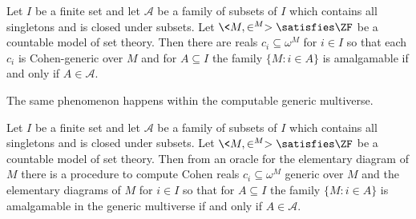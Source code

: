 \documentclass{amsart}
\begin{document}
\begin{theorem}
Let $I$ be a finite set and let $\mathcal A$ be a family of subsets of $I$ which contains all singletons and is closed under subsets. Let $\<M,\in^M>\satisfies\ZF$ be a countable
model of set theory. Then there are reals $c_i \subseteq \omega^M$ for $i \in I$ so that each $c_i$ is Cohen-generic over $M$ and for $A \subseteq I$ the family $\{M : i \in A\}$ is amalgamable if and only if $A \in \mathcal A$.
\end{theorem}
The same phenomenon happens within the computable generic multiverse.
\begin{theorem}
Let $I$ be a finite set and let $\mathcal A$ be a family of subsets of $I$ which contains all singletons and is closed under subsets. Let $\<M,\in^M>\satisfies\ZF$ be a countable model of set theory. Then from an oracle for the elementary diagram of $M$ there is a procedure to compute Cohen reals $c_i \subseteq \omega^M$ generic over $M$ and the elementary diagrams of $M$ for $i \in I$ so that for $A \subseteq I$ the family $\{M : i \in A\}$ is amalgamable in the generic multiverse if and only if $A \in \mathcal A$.
\end{theorem}
\end{document}
